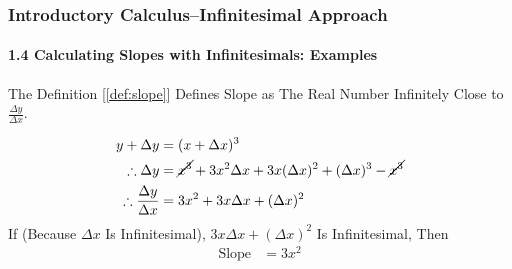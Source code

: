 \begin{frame}
\frametitle{Introductory Calculus--Infinitesimal Approach}
\framesubtitle{1.4 Calculating Slopes with Infinitesimals: Examples}
\label{slide:1.4-11}
\begin{example}[Slope of $y=x^3$]
The Definition [\ref{def:slope}] Defines Slope as \alert{The Real Number Infinitely Close to $\frac{\Delta y}{\Delta x}$}.

\begin{equation}
\begin{aligned}
y+\Delta y &= (x+\Delta x)^3  \\
\therefore \Delta y &= \cancel{x^3}+3x^2\Delta x+3x(\Delta x)^2+(\Delta x)^3-\cancel{x^3}\\
\therefore \frac{\Delta y}{\Delta x} &= 3x^2+3x\Delta x+(\Delta x)^2 \\
\end{aligned}
\label{eq:slope-of-y=x^3}
\end{equation}
If (Because $\Delta x$ Is Infinitesimal), $3x\Delta x+(\Delta x)^2$ Is Infinitesimal, Then 
\begin{equation}
\begin{aligned}
\text{Slope}&=3x^2
\end{aligned}
\end{equation}
\end{example}
\end{frame}
